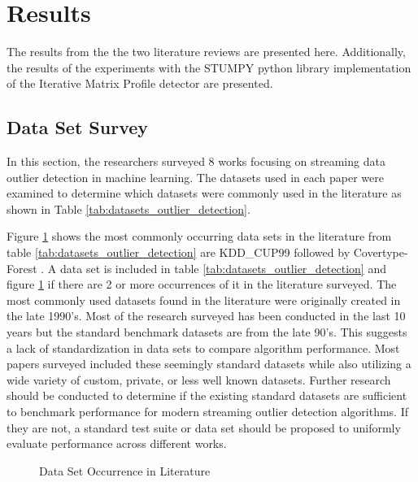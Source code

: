 \section{Results}
\label{ref_results}

The results from the the two literature reviews are presented here. Additionally, the results of the experiments with the STUMPY python library implementation of the Iterative Matrix Profile detector are presented.

\subsection{Data Set Survey}
In this section, the researchers surveyed 8 works focusing on streaming data outlier detection in machine learning. The datasets used in each paper were examined to determine which datasets were commonly used in the literature as shown in Table \ref{tab:datasets_outlier_detection}. 



Figure \ref{fig_dataset_lit} shows the most commonly occurring data sets in the literature from table \ref{tab:datasets_outlier_detection} are KDD\_CUP99 \parencite{kdd1999} followed by Covertype-Forest \parencite{covertype-dataset}. A data set is included in table \ref{tab:datasets_outlier_detection} and figure \ref{fig_dataset_lit} if there are 2 or more occurrences of it in the literature surveyed. The most commonly used datasets found in the literature were originally created in the late 1990's. Most of the research surveyed has been conducted in the last 10 years but the standard benchmark datasets are from the late 90's. This suggests a lack of standardization in data sets to compare algorithm performance. Most papers surveyed included these seemingly standard datasets while also utilizing a wide variety of custom, private, or less well known datasets. Further research should be conducted to determine if the existing standard datasets are sufficient to benchmark performance for modern streaming outlier detection algorithms. If they are not, a standard test suite or data set should be proposed to uniformly evaluate performance across different works.

\begin{figure}[h]
    \caption{Data Set Occurrence in Literature }
    \label{fig_dataset_lit}
\end{figure}

